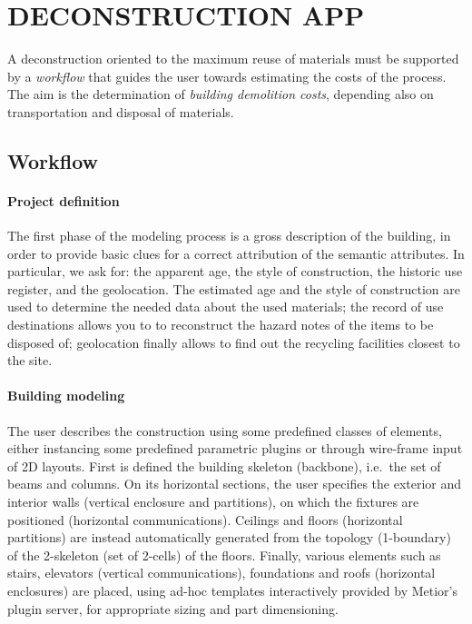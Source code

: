 
\section{\uppercase{Deconstruction App}}

\label{sec:application}

\noindent
A deconstruction oriented to the maximum reuse of materials must be supported by a \emph{workflow} that guides the user towards estimating the costs of the process. The aim is the determination of  \emph{building demolition costs}, depending also on transportation  and disposal of materials.

\vspace{-3mm}\subsection{Workflow}\vspace{-3mm}

\paragraph{Project definition} 

The first phase of the modeling process is a gross description of the building, in order to provide basic clues for a correct attribution of the semantic attributes.
In particular, we ask for: the apparent age, the style of construction, the historic use register, and the geolocation.
The estimated age and the style of construction are used to determine the needed data about the used materials; the record of use destinations allows you to to reconstruct the hazard notes of the items to be disposed of; geolocation finally allows to find out the recycling facilities closest to the site.

\vspace{-2mm}\paragraph{Building modeling} 
The user describes the construction using some predefined classes of elements, either instancing some  predefined parametric plugins or through wire-frame input of 2D layouts. 
First is defined the building skeleton (backbone), i.e.~the set of beams and columns.
On its horizontal sections, the user specifies the exterior and interior walls (vertical enclosure and partitions), on which the fixtures are positioned (horizontal communications).
Ceilings and floors (horizontal partitions) are instead automatically generated from the topology (1-boundary) of the 2-skeleton (set of 2-cells) of the floors.
Finally, various elements such as stairs, elevators (vertical communications), foundations and roofs (horizontal enclosures) are placed, using ad-hoc templates interactively provided by Metior's plugin server, for appropriate sizing and part dimensioning.

